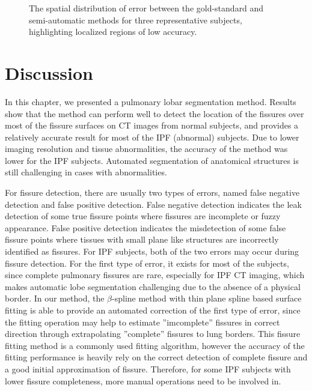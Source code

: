 {\begin{figure}[htbp]
\begin{subfigure}{.38 \linewidth}
  \caption{}
  \label{fig:QuanlititativeResult-c} 
\end{subfigure}
\caption{The spatial distribution of error between the gold-standard and semi-automatic methods for three representative subjects, highlighting localized regions of low accuracy.}
\label{fig:QuanlititativeResult}
\end{figure}

\section{Discussion} \label{SegmentationDiscussion}
In this chapter, we presented a pulmonary lobar segmentation method. Results show that the method can perform well to detect the location of the fissures over most of the fissure surfaces on CT images from normal subjects, and provides a relatively accurate result for most of the IPF (abnormal) subjects. Due to lower imaging resolution and tissue abnormalities, the accuracy of the method was lower for the IPF subjects. Automated segmentation of anatomical structures is still challenging in cases with abnormalities. 

For fissure detection, there are usually two types of errors, named false negative detection and false positive detection. False negative detection indicates the leak detection of some true fissure points where fissures are incomplete or fuzzy appearance. False positive detection indicates the misdetection of some false fissure points where tissues with small plane like structures are incorrectly identified as fissures. For IPF subjects, both of the two errors may occur during fissure detection. For the first type of error, it exists for most of the subjects, since complete pulmonary fissures are rare, especially for IPF CT imaging, which makes automatic lobe segmentation challenging due to the absence of a physical border. In our method, the $\beta$-spline method with thin plane spline based surface fitting is able to provide an automated correction of the first type of error, since the fitting operation may help to estimate ''imcomplete'' fissures in correct direction through extrapolating ''complete'' fissures to lung borders. This fissure fitting method  is a commonly used fitting algorithm, however the accuracy of the fitting performance is heavily rely on the correct detection of complete fissure and a good initial approximation of fissure. Therefore, for some IPF subjects with lower fissure completeness, more manual operations need to be involved in.

}
